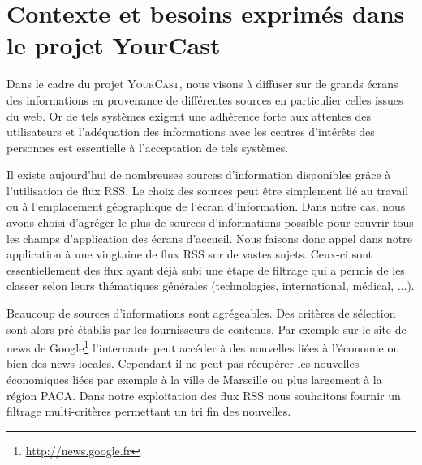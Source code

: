 \documentclass[]{easychair}
\newcommand{\Y}[0]{\textsc{YourCast}\xspace}
\begin{document}

\section{Contexte et besoins exprimés dans le projet YourCast}
\label{sect:exemple}
Dans le cadre du projet \Y, nous visons à diffuser sur de grands écrans des informations en provenance de différentes sources en particulier celles issues du web. Or de tels systèmes exigent une adhérence forte aux attentes des utilisateurs et l'adéquation des informations avec les centres d'intérêts des personnes est essentielle à l'acceptation de tels systèmes. 


Il existe aujourd'hui de nombreuses sources d'information disponibles grâce à l'utilisation de flux RSS. Le choix des sources peut être simplement lié au travail ou à l'emplacement géographique de l'écran d'information.
Dans notre cas, nous avons choisi d'agréger le plus de sources d'informations possible pour couvrir tous les champs d'application des écrans d'accueil. 
Nous faisons donc appel dans notre application à une vingtaine de flux RSS sur de vastes sujets. Ceux-ci sont essentiellement des flux ayant déjà subi une étape de filtrage qui a permis de les classer selon leurs thématiques générales (technologies, international, médical, ...).

Beaucoup de sources d'informations sont agrégeables. Des critères de sélection sont alors pré-établis par les fournisseurs de contenus.  Par exemple sur le site de news de Google\footnote{\url{http://news.google.fr}} l'internaute peut accéder à des nouvelles liées à l'économie ou bien des news locales. Cependant il ne peut pas récupérer les nouvelles économiques liées par exemple à la ville de Marseille ou plus largement à la région PACA. Dans notre exploitation des flux RSS nous souhaitons fournir un filtrage multi-critères permettant un tri fin des nouvelles. 
\end{document}
